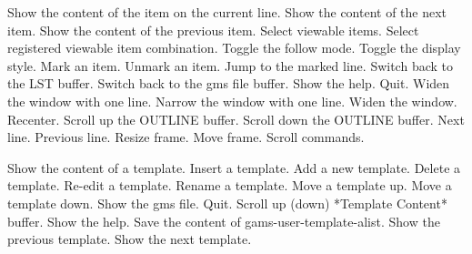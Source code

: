 \documentclass{article}
\begin{document}


  Show the content of the item on the current line.
  Show the content of the next item.
  Show the content of the previous item.
  Select viewable items.
  Select registered viewable item combination.
  Toggle the follow mode.
  Toggle the display style.
\key{} 
  Mark an item.
  Unmark an item.
  Jump to the marked line.
\key{} 
  Switch back to the LST buffer.
\key{;}  Switch back to the gms file buffer.
  Show the help.
  Quit.
\key{} 
  Widen the window with one line.
  Narrow the window with one line.
  Widen the window.
  Recenter.
  Scroll up the OUTLINE buffer.
  Scroll down the OUTLINE buffer.
\key{} 
          Next line.
          Previous line.
          Resize frame.
          Move frame.
\key{} 
          Scroll commands.



  Show the content of a template.
  Insert a template.
  Add a new template.
  Delete a template.
  Re-edit a template.
  Rename a template.
  Move a template up.
  Move a template down.
  Show the gms file.
  Quit.
\key{} 
       Scroll up (down) *Template Content* buffer.
  Show the help.
  Save the content of gams-user-template-alist.
  Show the previous template.
   Show the next template.



\vspace*{\fill}
\cr
\end{document}
